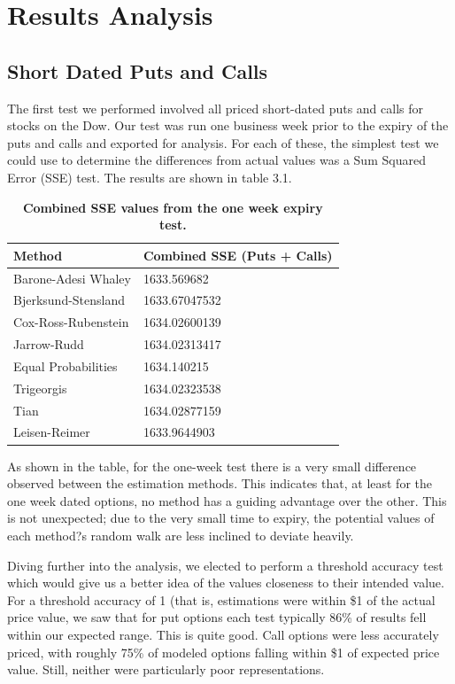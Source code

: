 \chapter{Results Analysis}

\section{Short Dated Puts and Calls}

The first test we performed involved all priced short-dated puts and calls for stocks on the Dow. Our test was run one business week prior to the expiry of the puts and calls and exported for analysis. For each of these, the simplest test we could use to determine the differences from actual values was a Sum Squared Error (SSE) test. The results are shown in table 3.1.

\begin{table}[h!]
\centering
\begin{tabu} to .8\textwidth { | X[c] | X[c] | }
 \hline
Method & Combined SSE (Puts + Calls)\\
 \hline
Barone-Adesi Whaley & 1633.569682 \\
Bjerksund-Stensland &  1633.67047532\\
Cox-Ross-Rubenstein & 1634.02600139 \\
Jarrow-Rudd & 1634.02313417 \\
Equal Probabilities & 1634.140215 \\
Trigeorgis & 1634.02323538 \\
Tian & 1634.02877159\\
Leisen-Reimer & 1633.9644903\\
\hline
\end{tabu}
\caption {\textbf{Combined SSE values from the one week expiry test.}}
\end{table}

As shown in the table, for the one-week test there is a very small difference observed between the estimation methods. This indicates that, at least for the one week dated options, no method has a guiding advantage over the other. This is not unexpected; due to the very small time to expiry, the potential values of each method?s random walk are less inclined to deviate heavily.

Diving further into the analysis, we elected to perform a threshold accuracy test which would give us a better idea of the values closeness to their intended value. For a threshold accuracy of 1 (that is, estimations were within \$1 of the actual price value, we saw that for put options each test typically 86\% of results fell within our expected range. This is quite good. Call options were less accurately priced, with roughly 75\% of modeled options falling within \$1 of expected price value. Still, neither were particularly poor representations.

